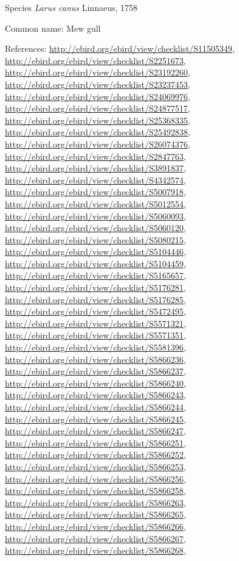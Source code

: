 \documentclass[9pt, article]{memoir}
\begin{document}
\begin{multicols}{2}
\vspace{6pt}\noindent\hspace{36pt}Species \textit{Larus canus} Linnaeus, 1758


Common name: Mew gull

References: 
\url{http://ebird.org/ebird/view/checklist/S11505349}, 
\url{http://ebird.org/ebird/view/checklist/S2251673}, 
\url{http://ebird.org/ebird/view/checklist/S23192260}, 
\url{http://ebird.org/ebird/view/checklist/S23237453}, 
\url{http://ebird.org/ebird/view/checklist/S24069976}, 
\url{http://ebird.org/ebird/view/checklist/S24877517}, 
\url{http://ebird.org/ebird/view/checklist/S25368335}, 
\url{http://ebird.org/ebird/view/checklist/S25492838}, 
\url{http://ebird.org/ebird/view/checklist/S26074376}, 
\url{http://ebird.org/ebird/view/checklist/S2847763}, 
\url{http://ebird.org/ebird/view/checklist/S3891837}, 
\url{http://ebird.org/ebird/view/checklist/S4342574}, 
\url{http://ebird.org/ebird/view/checklist/S5007918}, 
\url{http://ebird.org/ebird/view/checklist/S5012554}, 
\url{http://ebird.org/ebird/view/checklist/S5060093}, 
\url{http://ebird.org/ebird/view/checklist/S5060120}, 
\url{http://ebird.org/ebird/view/checklist/S5080215}, 
\url{http://ebird.org/ebird/view/checklist/S5104446}, 
\url{http://ebird.org/ebird/view/checklist/S5104459}, 
\url{http://ebird.org/ebird/view/checklist/S5165657}, 
\url{http://ebird.org/ebird/view/checklist/S5176281}, 
\url{http://ebird.org/ebird/view/checklist/S5176285}, 
\url{http://ebird.org/ebird/view/checklist/S5472495}, 
\url{http://ebird.org/ebird/view/checklist/S5571321}, 
\url{http://ebird.org/ebird/view/checklist/S5571351}, 
\url{http://ebird.org/ebird/view/checklist/S5581396}, 
\url{http://ebird.org/ebird/view/checklist/S5866236}, 
\url{http://ebird.org/ebird/view/checklist/S5866237}, 
\url{http://ebird.org/ebird/view/checklist/S5866240}, 
\url{http://ebird.org/ebird/view/checklist/S5866243}, 
\url{http://ebird.org/ebird/view/checklist/S5866244}, 
\url{http://ebird.org/ebird/view/checklist/S5866245}, 
\url{http://ebird.org/ebird/view/checklist/S5866247}, 
\url{http://ebird.org/ebird/view/checklist/S5866251}, 
\url{http://ebird.org/ebird/view/checklist/S5866252}, 
\url{http://ebird.org/ebird/view/checklist/S5866253}, 
\url{http://ebird.org/ebird/view/checklist/S5866256}, 
\url{http://ebird.org/ebird/view/checklist/S5866258}, 
\url{http://ebird.org/ebird/view/checklist/S5866263}, 
\url{http://ebird.org/ebird/view/checklist/S5866265}, 
\url{http://ebird.org/ebird/view/checklist/S5866266}, 
\url{http://ebird.org/ebird/view/checklist/S5866267}, 
\url{http://ebird.org/ebird/view/checklist/S5866268}, 

\end{multicols}
\end{document}
